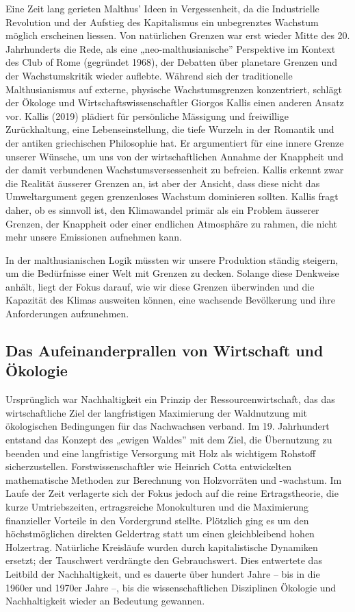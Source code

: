 \documentclass[
  nswissgerman,
  a4paper,
  openany]{book}
\begin{document}
Eine Zeit lang gerieten Malthus' Ideen in Vergessenheit, da die
Industrielle Revolution und der Aufstieg des Kapitalismus ein
unbegrenztes Wachstum möglich erscheinen liessen. Von natürlichen
Grenzen war erst wieder Mitte des 20. Jahrhunderts die Rede, als eine
„neo-malthusianische'' Perspektive im Kontext des Club of Rome
(gegründet 1968), der Debatten über planetare Grenzen und der
Wachstumskritik wieder auflebte. Während sich der traditionelle
Malthusianismus auf externe, physische Wachstumsgrenzen konzentriert,
schlägt der Ökologe und Wirtschaftswissenschaftler Giorgos Kallis einen
anderen Ansatz vor. Kallis (2019) plädiert für persönliche Mässigung und
freiwillige Zurückhaltung, eine Lebenseinstellung, die tiefe Wurzeln in
der Romantik und der antiken griechischen Philosophie hat. Er
argumentiert für eine innere Grenze unserer Wünsche, um uns von der
wirtschaftlichen Annahme der Knappheit und der damit verbundenen
Wachstumsversessenheit zu befreien. Kallis erkennt zwar die Realität
äusserer Grenzen an, ist aber der Ansicht, dass diese nicht das
Umweltargument gegen grenzenloses Wachstum dominieren sollten. Kallis
fragt daher, ob es sinnvoll ist, den Klimawandel primär als ein Problem
äusserer Grenzen, der Knappheit oder einer endlichen Atmosphäre zu
rahmen, die nicht mehr unsere Emissionen aufnehmen kann.

In der malthusianischen Logik müssten wir unsere Produktion ständig
steigern, um die Bedürfnisse einer Welt mit Grenzen zu decken. Solange
diese Denkweise anhält, liegt der Fokus darauf, wie wir diese Grenzen
überwinden und die Kapazität des Klimas ausweiten können, eine wachsende
Bevölkerung und ihre Anforderungen aufzunehmen.

\subsection{Das Aufeinanderprallen von Wirtschaft und
Ökologie}\label{das-aufeinanderprallen-von-wirtschaft-und-uxf6kologie}

Ursprünglich war Nachhaltigkeit ein Prinzip der Ressourcenwirtschaft,
das das wirtschaftliche Ziel der langfristigen Maximierung der
Waldnutzung mit ökologischen Bedingungen für das Nachwachsen verband. Im
19. Jahrhundert entstand das Konzept des „ewigen Waldes'' mit dem Ziel,
die Übernutzung zu beenden und eine langfristige Versorgung mit Holz als
wichtigem Rohstoff sicherzustellen. Forstwissenschaftler wie Heinrich
Cotta entwickelten mathematische Methoden zur Berechnung von
Holzvorräten und -wachstum. Im Laufe der Zeit verlagerte sich der Fokus
jedoch auf die reine Ertragstheorie, die kurze Umtriebszeiten,
ertragsreiche Monokulturen und die Maximierung finanzieller Vorteile in
den Vordergrund stellte. Plötzlich ging es um den höchstmöglichen
direkten Geldertrag statt um einen gleichbleibend hohen Holzertrag.
Natürliche Kreisläufe wurden durch kapitalistische Dynamiken ersetzt;
der Tauschwert verdrängte den Gebrauchswert. Dies entwertete das
Leitbild der Nachhaltigkeit, und es dauerte über hundert Jahre -- bis in
die 1960er und 1970er Jahre --, bis die wissenschaftlichen Disziplinen
Ökologie und Nachhaltigkeit wieder an Bedeutung gewannen.
\end{document}
